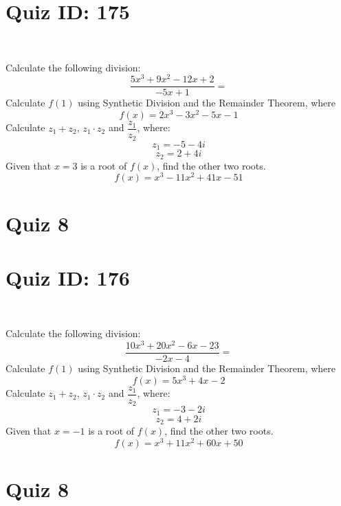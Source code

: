 \documentclass{exam}
\begin{document}
\section*{Quiz ID: 175}
\vspace{0.5cm}\
\vspace{1cm}\
\begin{questions}
\question Calculate the following division:\[\dfrac{
5x^3 + 9x^2 - 12x + 2}{
-5x + 1}=\] \makeemptybox{\stretch{2}}
\question Calculate $f(1)$ using Synthetic Division and the Remainder Theorem, where\[f(x) = 
2x^3 - 3x^2 - 5x - 1\]
\newpage\question Calculate $z_1+z_2$, $z_1\cdot z_2$ and $\dfrac{z_1}{z_2}$, where:\[z_1=-5-4\mathit{i}\]\[z_2=2+4\mathit{i}\]
\question Given that $x=3$ is a root of $f(x)$, find the other two roots.\[f(x)=
x^3 - 11x^2 + 41x - 51\]\makeemptybox{\stretch{1}}
\end{questions}\newpage
\newpage
\section*{Quiz 8}
\section*{Quiz ID: 176}
\vspace{0.5cm}\
\vspace{1cm}\
\begin{questions}
\question Calculate the following division:\[\dfrac{
10x^3 + 20x^2 - 6x - 23}{
-2x - 4}=\] 
\question Calculate $f(1)$ using Synthetic Division and the Remainder Theorem, where\[f(x) = 
5x^3 + 4x - 2\]
\newpage\question Calculate $z_1+z_2$, $z_1\cdot z_2$ and $\dfrac{z_1}{z_2}$, where:\[z_1=-3-2\mathit{i}\]\[z_2=4+2\mathit{i}\]\makeemptybox{\stretch{1}}
\question Given that $x=-1$ is a root of $f(x)$, find the other two roots.\[f(x)=
x^3 + 11x^2 + 60x + 50\]\makeemptybox{\stretch{1}}
\end{questions}\newpage
\newpage
\section*{Quiz 8}
\end{document}
